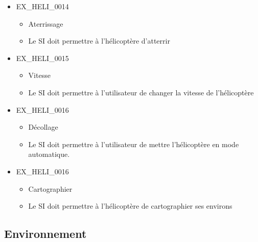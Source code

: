 \documentclass[12pt,a4paper]{scrartcl}
\begin{document}
\begin{itemize}
\item EX\_HELI\_0014
\begin{itemize}
\item Aterrissage
\item Le SI doit permettre à l'hélicoptère d'atterrir
\end{itemize}

\item EX\_HELI\_0015
\begin{itemize}
\item Vitesse
\item Le SI doit permettre à l'utilisateur de changer la vitesse de l'hélicoptère
\end{itemize}

\item EX\_HELI\_0016
\begin{itemize}
\item Décollage
\item Le SI doit permettre à l'utilisateur de mettre l'hélicoptère en mode automatique.
\end{itemize}

\item EX\_HELI\_0016
\begin{itemize}
\item Cartographier
\item Le SI doit permettre à l'hélicoptère de cartographier ses environs
\end{itemize}

\end{itemize}

\subsection{Environnement}
\end{document}
